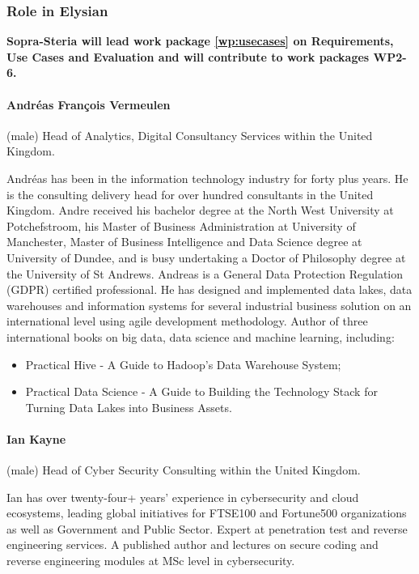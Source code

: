 \documentclass[a4paper,11pt]{article}
\begin{document}
\vspace{10pt}
\subsubsection*{Role in Elysian}
\textbf{Sopra-Steria will lead work package \ref{wp:usecases} on Requirements, Use Cases and Evaluation and will contribute to work packages WP2-6.}

\vspace{10pt}

\paragraph{Andr\'eas Fran\c{c}ois Vermeulen} (male) Head of Analytics, Digital Consultancy Services within the United Kingdom.

Andr\'eas has been in the information technology industry for forty plus years. He is the consulting delivery head for over hundred consultants in the United Kingdom. Andre received his bachelor degree at the North West University at Potchefstroom, his Master of Business Administration at University of Manchester, Master of Business Intelligence and Data Science degree at University of Dundee, and is busy undertaking a Doctor of Philosophy degree at the University of St Andrews. Andreas is a General Data Protection Regulation (GDPR) certified professional. He has designed and implemented data lakes, data warehouses and information systems for several industrial business solution on an international level using agile development methodology. Author of three international books on big data, data science and machine learning, including:
\begin{itemize}
\item Practical Hive - A Guide to Hadoop’s Data Warehouse System;
\item Practical Data Science - A Guide to Building the Technology Stack for Turning Data Lakes into Business
Assets.
\end{itemize}

\paragraph{Ian Kayne} (male)  Head of Cyber Security Consulting within the United Kingdom.

Ian has over twenty-four+ years’ experience in cybersecurity and cloud ecosystems, leading global initiatives for FTSE100 and Fortune500 organizations as well as Government and Public Sector. Expert at penetration test and reverse engineering services. A published author and lectures on secure coding and reverse engineering modules at MSc level in cybersecurity.
\end{document}

